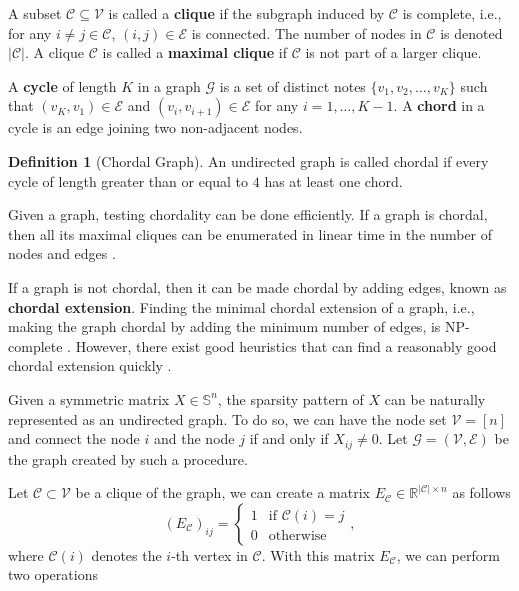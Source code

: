 \documentclass[
]{book}
\theoremstyle{definition}
\newtheorem{definition}{Definition}[chapter]
\theoremstyle{definition}
\theoremstyle{definition}
\theoremstyle{definition}
\theoremstyle{remark}
\begin{document}
A subset \(\mathcal{C}\subseteq \mathcal{V}\) is called a \textbf{clique} if the subgraph induced by \(\mathcal{C}\) is complete, i.e., for any \(i \neq j \in \mathcal{C}\), \((i,j) \in \mathcal{E}\) is connected. The number of nodes in \(\mathcal{C}\) is denoted \(|\mathcal{C}|\). A clique \(\mathcal{C}\) is called a \textbf{maximal clique} if \(\mathcal{C}\) is not part of a larger clique.

A \textbf{cycle} of length \(K\) in a graph \(\mathcal{G}\) is a set of distinct notes \(\{ v_1,v_2,\dots,v_K \}\) such that \((v_K,v_1) \in \mathcal{E}\) and \((v_i,v_{i+1}) \in \mathcal{E}\) for any \(i=1,\dots,K-1\). A \textbf{chord} in a cycle is an edge joining two non-adjacent nodes.

\begin{definition}[Chordal Graph]
\protect\hypertarget{def:ChordalGraph}{}\label{def:ChordalGraph}An undirected graph is called chordal if every cycle of length greater than or equal to \(4\) has at least one chord.
\end{definition}

Given a graph, testing chordality can be done efficiently. If a graph is chordal, then all its maximal cliques can be enumerated in linear time in the number of nodes and edges \citep{gavril72sic-algorithms}.

If a graph is not chordal, then it can be made chordal by adding edges, known as \textbf{chordal extension}. Finding the minimal chordal extension of a graph, i.e., making the graph chordal by adding the minimum number of edges, is NP-complete \citep{arnborg87siadm-complexity}. However, there exist good heuristics that can find a reasonably good chordal extension quickly \citep{vandenberghe15fto-chordal}.

Given a symmetric matrix \(X \in \mathbb{S}^{n}\), the sparsity pattern of \(X\) can be naturally represented as an undirected graph. To do so, we can have the node set \(\mathcal{V}= [n]\) and connect the node \(i\) and the node \(j\) if and only if \(X_{ij} \neq 0\). Let \(\mathcal{G}= (\mathcal{V}, \mathcal{E})\) be the graph created by such a procedure.

Let \(\mathcal{C}\subset \mathcal{V}\) be a clique of the graph, we can create a matrix \(E_{\mathcal{C}} \in \mathbb{R}^{|\mathcal{C}| \times n}\) as follows
\[
(E_{\mathcal{C}})_{ij} = \begin{cases}
1 & \text{if }\mathcal{C}(i) = j \\
0 & \text{otherwise}
\end{cases},
\]
where \(\mathcal{C}(i)\) denotes the \(i\)-th vertex in \(\mathcal{C}\). With this matrix \(E_{\mathcal{C}}\), we can perform two operations
\end{document}
